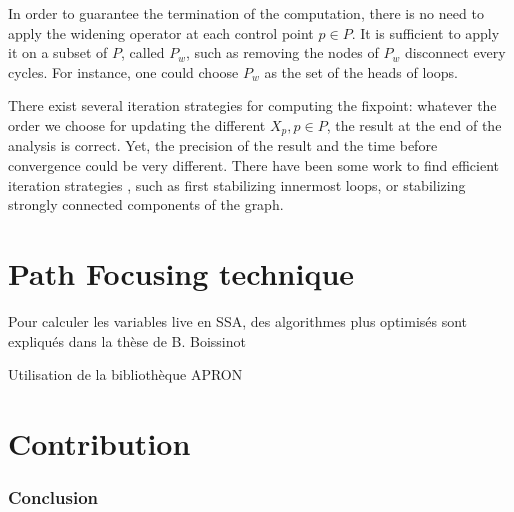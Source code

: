 \documentclass[a4paper,english,titlepage,11pt]{article}
\begin{document}
In order to guarantee the termination of the computation, there is no need to
apply the widening operator at each control point $p \in P$. It is sufficient to
apply it on a subset of $P$, called $P_w$, such as removing the nodes of $P_w$
disconnect every cycles. For instance, one could choose $P_w$ as the set of the
heads of loops.


There exist several iteration strategies for computing the fixpoint: whatever
the order we choose for updating the different $X_p, p\in P$, the result at the
end of the analysis is correct. Yet, the precision of the result and the time
before convergence could be very different. 
There have been some work to find efficient iteration strategies
\cite{Bou92}, such as first stabilizing innermost loops, or stabilizing strongly
connected components of the graph.

\part{Path Focusing technique}
  
	Pour calculer les variables live en SSA, des algorithmes plus optimisés sont
	expliqués dans la thèse de B. Boissinot\cite{Boi10}

	
	Utilisation de la bibliothèque APRON \cite{JM09}
  

\part{Contribution}

  \section{Conclusion}
  
  \appendix
  


  
\end{document}
